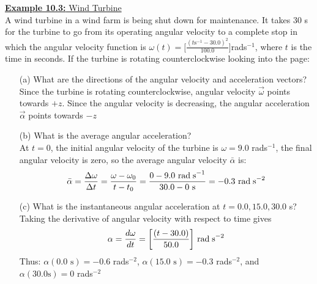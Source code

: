 \documentclass[a4paper]{article}
\let\bf\textbf
\newcommand\der[2]{\frac{d #1}{d #2}}
\begin{document}
\newpage
\begin{shaded}
    \underline{\bf{Example 10.3:} Wind Turbine}
    \vspace{2mm}\\
    A wind turbine in a wind farm is being shut down for maintenance. It takes 30 s for the turbine to go from its operating angular velocity to a complete stop in which the angular velocity function is $\omega(t) = \Big[\frac{(t\text{s}^{-1} - 30.0)^2}{100.0}\Big]$rad\;s$^{-1}$, where $t$ is the time in seconds. If the turbine is rotating counterclockwise looking into the page:
    \begin{enumerate}
        \item[(a)] What are the directions of the angular velocity and acceleration vectors?
        \vspace{1mm}\\
        Since the turbine is rotating counterclockwise, angular velocity $\vec{\omega}$ points towards $+z$. Since the angular velocity is decreasing, the angular acceleration $\vec{\alpha}$ points towards $-z$
        \item[(b)] What is the average angular acceleration?
        \vspace{1mm}\\
        At $t = 0$, the initial angular velocity of the turbine is $\omega = 9.0$ rad\;s$^{-1}$, the final angular velocity is zero, so the average angular velocity $\bar{\alpha}$ is:
        \begin{align*}
            \bar{\alpha} = \frac{\Delta\omega}{\Delta t} = \frac{\omega - \omega_0}{t - t_0} = \frac{0 - 9.0\text{ rad\;s}^{-1}}{30.0 - 0\text{ s}} = -0.3\text{ rad\;s}^{-2}
        \end{align*}
        \item[(c)] What is the instantaneous angular acceleration at $t = 0.0, 15.0, 30.0$ s?
        \vspace{1mm}\\
        Taking the derivative of angular velocity with respect to time gives
        \begin{align*}
            \alpha = \der{\omega}{t} = \bigg[\frac{(t - 30.0)}{50.0}\bigg]\text{ rad\;s}^{-2}
        \end{align*}
        Thus:\hspace{2.5mm} $\alpha(0.0\text{ s}) = -0.6$ rad\;s$^{-2}$, $\alpha(15.0\text{ s}) = -0.3$ rad\;s$^{-2}$, and $\alpha(30.0\text{s}) = 0$ rad\;s$^{-2}$
    \end{enumerate}
\end{shaded}
\end{document}
